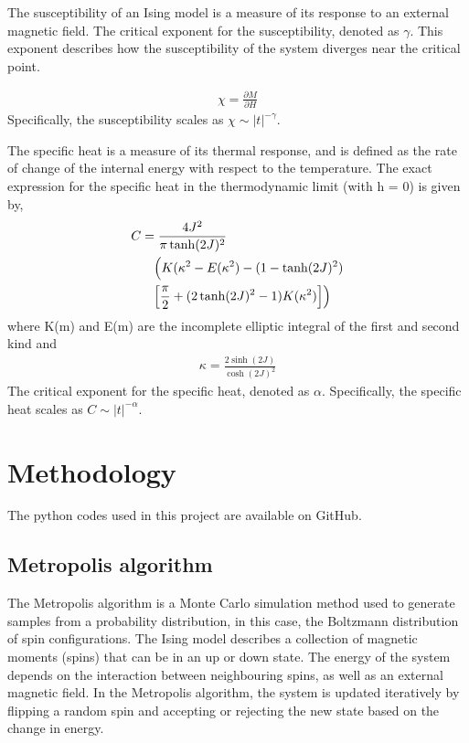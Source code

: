 \documentclass[%
reprint,
 amsmath,amssymb,
 aps,
]{revtex4-2}
\begin{document}
The susceptibility of an Ising model is a measure of its response to an external magnetic field. The critical exponent for the susceptibility, denoted as $\gamma$. This exponent describes how the susceptibility of the system diverges near the critical point. 

\begin{align}
    \chi = \frac{\partial M}{\partial H} 
\end{align}
Specifically, the susceptibility scales as $\chi \sim |t|^{-\gamma}$.

The specific heat is a measure of its thermal response, and is defined as the rate of change of the internal energy with respect to the temperature. The exact expression for the specific heat in the thermodynamic limit (with h = 0) is given by,
\begin{align}
    C &= \frac{4J^{2}}{\pi \tanh(2J)^{2}} \notag \\
    &\quad \Bigl( K(\kappa^{2}-E(\kappa^{2})-(1- \tanh(2J)^{2}) \\ 
    &\quad \Bigl[\frac{\pi}{2} + (2\tanh(2J)^{2}-1)K(\kappa^{2}) \Bigr]\Bigr) \notag  
\end{align}
where K(m) and E(m) are the incomplete elliptic integral of the first and second kind and 
\begin{align}
    \kappa = \frac{2\sinh(2J)}{\cosh(2J)^{2}}
\end{align}
The critical exponent for the specific heat, denoted as $\alpha$.
Specifically, the specific heat scales as $C \sim |t|^{-\alpha}$.


\section{Methodology}
The python codes used in this project are available on GitHub\cite{gitcode}.
\subsection{Metropolis algorithm}
The Metropolis algorithm is a Monte Carlo simulation method used to generate samples from a probability distribution, in this case, the Boltzmann distribution of spin configurations. The Ising model describes a collection of magnetic moments (spins) that can be in an up or down state. The energy of the system depends on the interaction between neighbouring spins, as well as an external magnetic field. In the Metropolis algorithm, the system is updated iteratively by flipping a random spin and accepting or rejecting the new state based on the change in energy.
\end{document}
